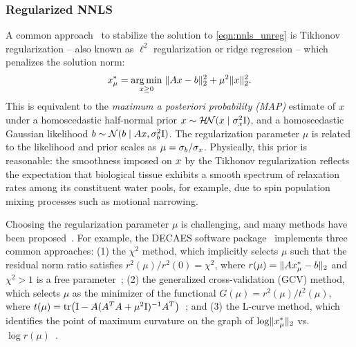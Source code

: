 \subsubsection{Regularized NNLS}\label{subsubsec:regularized_nnls}

A common approach~\citep{tikhonov_solutions_1977,golub_tikhonov_1999} to stabilize the solution to \eqref{eqn:nnls_unreg} is Tikhonov regularization -- also known as $\ell^2$ regularization or ridge regression -- which penalizes the solution norm:
\begin{align}\label{eqn:nnls_tikh}
    x^*_{\mu} = \underset{x \ge 0}{\operatorname{arg\,min}} \; \lVert A x - b \rVert_2^2 + \mu^2 \lVert x \rVert_2^2.
\end{align}
This is equivalent to the \textit{maximum a posteriori probability (\gls*{MAP})} estimate of $x$ under a homoscedastic half-normal prior $x \sim \mathcal{H}\!\mathcal{N}(x \mid \sigma_{x}^2 \mathrm{I})$, and a homoscedastic Gaussian likelihood $b \sim \mathcal{N}(b \mid A x, \sigma_{b}^2 \mathrm{I})$.
The regularization parameter $\mu$ is related to the likelihood and prior scales as $\mu = \sigma_{b} / \sigma_{x}$.
Physically, this prior is reasonable: the smoothness imposed on $x$ by the Tikhonov regularization reflects the expectation that biological tissue exhibits a smooth spectrum of relaxation rates among its constituent water pools, for example, due to spin population mixing processes such as motional narrowing.

Choosing the regularization parameter $\mu$ is challenging, and many methods have been proposed~\citep{hansen_analysis_1992,hansen_truncatedsvd_1987,hansen_adaptive_2007,cultrera_simple_2020}.
For example, the \gls*{DECAES} software package~\citep{doucette_decaes_2020} implements three common approaches:
(1) the $\chi^2$ method, which implicitly selects $\mu$ such that the residual norm ratio satisfies $r^2(\mu) / r^2(0) = \chi^2$, where $r(\mu) = \lVert A x^*_{\mu} - b \rVert_{2}$ and $\chi^2 > 1$ is a free parameter~\citep{prasloski_applications_2012};
(2) the generalized cross-validation (\gls*{GCV}) method, which selects $\mu$ as the minimizer of the functional $G(\mu) = r^2(\mu) / t^2(\mu)$, where $t(\mu) = \Tr{\Id - \epgbases (\epgbases^T \epgbases + \mu^2 \Id)^{-1}\epgbases^T}$~\citep{hansen_analysis_1992};
and (3) the L-curve method, which identifies the point of maximum curvature on the graph of $\log \lVert x^*_{\mu} \rVert_{2}$ vs.\ $\log r(\mu)$~\citep{hansen_analysis_1992,cultrera_simple_2020}.

